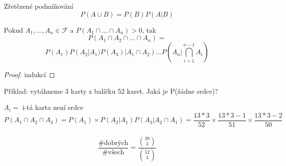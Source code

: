 \documentclass[../main.tex]{subfiles}
\begin{document}
\begin{definition}
    Zřetězené podmíňování\\
    \[P(A\cup B) = P(B)P(A|B)\]
\end{definition}
\begin{theorem}
    Pokud $A_1,\dots,A_n \in \mathcal{F}$ a $P(A_1\cap \dots \cap A_n) > 0$, tak
    \[P(A_1\cap A_2 \cap \dots \cap A_n) = \]
    \[P(A_1)P(A_2|A_1)P(A_3)|A_1\cap A_2) \dots P(A_n | \bigcap^{n-1}_{i=1} A_i)\]
    \begin{proof}
        indukcí    
    \end{proof}
\end{theorem}

\begin{example}
    Příklad: vytáhneme 3 karty z balíčku 52 karet. Jaká je P(žádne srdce)?

    $A_i =$ i-tá karta není srdce\\
    \[P(A_1\cap A_2 \cap A_3) = P(A_1) \times P(A_2 | A_1) P(A_3 | A_2\cap A_1) = \frac{13*3}{52} \times \frac{13*3 -1}{51} \times \frac{13*3 - 2}{50}\]
    \\ \[\frac{\text{\#dobrých}}{\text{\#všech}} = \frac{\binom{39}{3}}{\binom{52}{3}}\]
\end{example}
\end{document}
